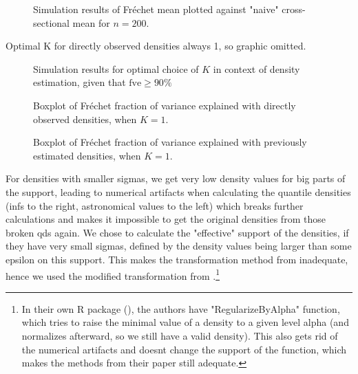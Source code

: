 \begin{figure}[h]
    \centering
    \resizebox{0.9\textwidth}{!}{}
    \caption[Simulation results: Fréchet mean vs cross-sectional mean]{Simulation
    results of Fréchet mean plotted against "naive" cross-sectional mean for $n = 200$.}
    \label{fig:sim_f_vs_cs}
\end{figure}

Optimal K for directly observed densities always 1, so graphic omitted.

\begin{figure}[h]
    \centering
    \resizebox{0.9\textwidth}{!}{}
    \caption[Simulation results: optimal $K$]{Simulation results for optimal choice of
    $K$ in context of density estimation, given that $\text{fve} \geq 90 \%$}
    \label{fig:sim_k_opt_denstimation}
\end{figure}

\begin{figure}[h]
    \centering
    \resizebox{0.9\textwidth}{!}{}
    \caption[Simulation results: boxplots fve --- observed densities]{Boxplot of
    Fréchet fraction of variance explained with directly observed
    densities, when $K = 1$.}
    \label{fig:sim_fve}
\end{figure}

\begin{figure}[h]
    \centering
    \resizebox{0.9\textwidth}{!}{}
    \caption[Simulation results: boxplots fve --- estimated densities]{Boxplot of
    Fréchet fraction of variance explained with previously estimated densities, when
    $K = 1$.}
    \label{fig:sim_fve_denstimation}
\end{figure}

For densities with smaller sigmas, we get very low density values for big parts of the
support, leading to numerical artifacts when calculating the quantile densities (infs
to the right, astronomical values to the left) which breaks further calculations and
makes it impossible to get the original densities from those broken qds again. We chose
to calculate the "effective" support of the densities, if they have very small sigmas,
defined by the density values being larger than some epsilon on this support. This
makes the transformation method from \textcite{PetersenMüller2016} inadequate, hence we
used the modified transformation from \textcite{KokoszkaEtAl2019}.\footnote{In their own R
package (), the authors have "RegularizeByAlpha" function, which tries to raise the minimal
value of a density to a given level alpha (and normalizes afterward, so we still have a
valid density). This also gets rid of the numerical artifacts and doesnt change the
support of the function, which makes the methods from their paper still adequate.}

